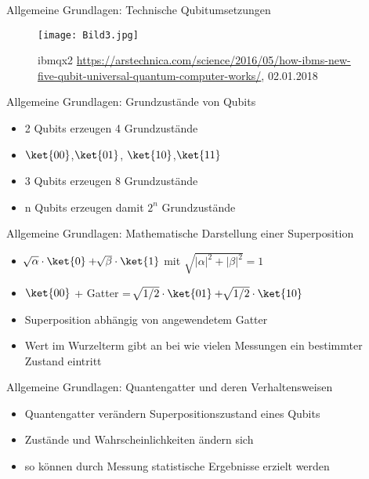 \documentclass[]{beamer}
\begin{document}
\begin{frame}{Allgemeine Grundlagen: Technische Qubitumsetzungen}
\begin{center}
	\begin{figure}
  		\texttt{[image: Bild3.jpg]}
 	 	\caption{ibmqx2 \newline\footnotesize{\url{https://arstechnica.com/science/2016/05/how-ibms-new-five-qubit-universal-quantum-computer-works/}, 02.01.2018}}
 	 	\centering
  	\end{figure}
\end{center}
\end{frame}


\begin{frame}{Allgemeine Grundlagen: Grundzustände von Qubits}
\begin{center}
	\begin{itemize}
	\item 2 Qubits erzeugen 4 Grundzustände
    \item $\ket{00}$,$\ket{01}$, $\ket{10}$,$\ket{11}$
    \item 3 Qubits erzeugen 8 Grundzustände
    \item n Qubits erzeugen damit $2^n$ Grundzustände
	\end{itemize}
\end{center}
\end{frame}


\begin{frame}{Allgemeine Grundlagen: Mathematische Darstellung einer Superposition}
\begin{center}
	\begin{itemize}
	\item $\sqrt[]{\alpha} \cdot  \ket{0} + \sqrt[]{\beta} \cdot \ket{1}$ mit $\sqrt{|\alpha|^2 + |\beta|^2} = 1$
	\item $\ket{00}$ + Gatter =  $\sqrt[]{1/2} \cdot  \ket{01} + \sqrt[]{1/2} \cdot \ket{10}$
    \item Superposition abhängig von angewendetem Gatter
    \item Wert im Wurzelterm gibt an bei wie vielen Messungen ein bestimmter Zustand eintritt
	\end{itemize}
\end{center}
\end{frame}

\begin{frame}{Allgemeine Grundlagen: Quantengatter und deren Verhaltensweisen}
\begin{center} %
	\begin{itemize}
	\item Quantengatter verändern Superpositionszustand eines Qubits
    \item Zustände und Wahrscheinlichkeiten ändern sich
    \item so können durch Messung statistische Ergebnisse erzielt werden
\end{itemize}
\end{center}
\end{frame}
\end{document}
